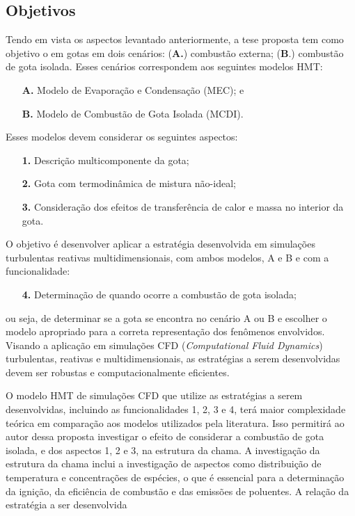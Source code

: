 \subsection{Objetivos} \label{sec:objetivos}

Tendo em vista os aspectos levantado anteriormente, a tese proposta tem como objetivo o  em gotas em dois cenários: (\textbf{A.}) combustão externa; (\textbf{B}.) combustão de gota isolada.
Esses cenários correspondem aos seguintes modelos HMT:
\begin{enumerate}
    \item[\textbf{A.}] Modelo de Evaporação e Condensação (MEC); e 
    \item[\textbf{B.}] Modelo de Combustão de Gota Isolada (MCDI).
\end{enumerate}
Esses modelos devem considerar os seguintes aspectos: 
\begin{enumerate}
    \item[\textbf{1.}] Descrição multicomponente da gota; 
    \item[\textbf{2.}] Gota com termodinâmica de mistura não-ideal; 
    \item[\textbf{3.}] Consideração dos efeitos de transferência	de calor e massa no interior da gota. 
\end{enumerate}
O objetivo é desenvolver aplicar a estratégia desenvolvida em simulações turbulentas reativas multidimensionais, com ambos modelos, {A} e {B} e com a funcionalidade:
\begin{enumerate}
    \item[\textbf{4.}] Determinação de quando ocorre a combustão de gota isolada;
\end{enumerate}
ou seja, de determinar se a gota se encontra no cenário {A} ou {B} e escolher o modelo apropriado para a correta representação dos fenômenos envolvidos.
Visando a aplicação em simulações CFD (\emph{Computational Fluid Dynamics}) turbulentas, reativas e multidimensionais, as estratégias a serem desenvolvidas devem ser robustas e computacionalmente eficientes.

O modelo HMT de simulações CFD que utilize as estratégias a serem desenvolvidas, incluindo as funcionalidades {1}, {2}, {3} e {4}, terá maior complexidade teórica em comparação aos modelos utilizados pela literatura. 
Isso permitirá ao autor dessa proposta investigar o efeito de considerar a combustão de gota isolada, e dos aspectos {1}, {2} e {3}, na estrutura da chama.
A investigação da estrutura da chama inclui a investigação de aspectos como distribuição de temperatura e concentrações de espécies, o que é essencial para a determinação da ignição, da eficiência de combustão e das emissões de poluentes.
A relação da estratégia a ser desenvolvida 